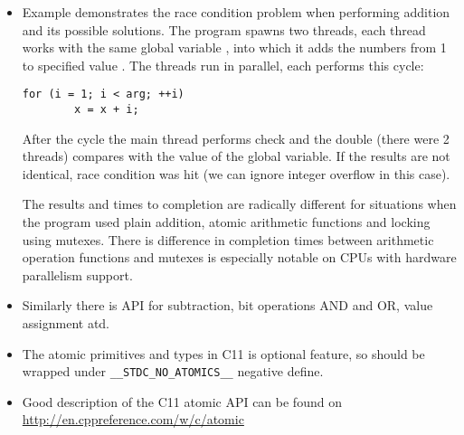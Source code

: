 \begin{itemize}
\item \label{ATOMIC_ADD} Example  demonstrates
the race condition problem when performing addition and its possible solutions.
The program spawns two threads, each thread works with the same global variable
, into which it adds the numbers from 1 to specified value .
The threads run in parallel, each performs this cycle:

\begin{verbatim}
for (i = 1; i < arg; ++i)
        x = x + i;
\end{verbatim}

After the cycle the main thread performs check and the double (there were
2 threads) compares with the value of the  global variable.
If the results are not identical, race condition was hit (we can ignore
integer overflow in this case).
\par
The results and times to completion are radically different for situations
when the program used plain addition, atomic arithmetic functions and locking
using mutexes. There is difference in completion times between 
arithmetic operation functions and mutexes is especially notable on
CPUs with hardware parallelism support.
\item Similarly there is API for subtraction, bit operations
AND and OR, value assignment atd.
\item The atomic primitives and types in C11 is optional feature, so should
be wrapped under \texttt{\_\_STDC\_NO\_ATOMICS\_\_} negative define.
\item Good description of the C11 atomic API can be found on
\url{http://en.cppreference.com/w/c/atomic}
\end{itemize}




